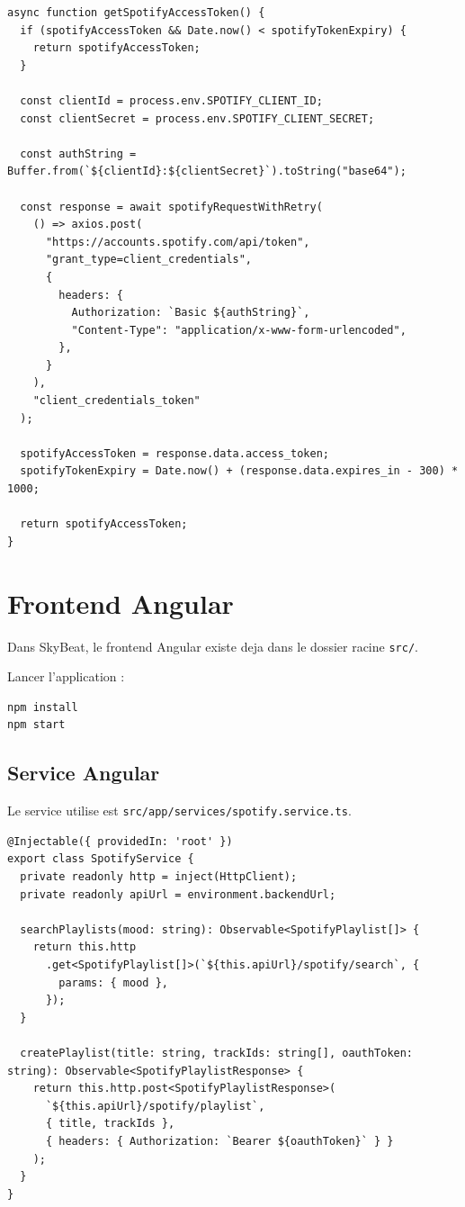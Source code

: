 \documentclass[a4paper,11pt]{article}
\begin{document}
\begin{lstlisting}
async function getSpotifyAccessToken() {
  if (spotifyAccessToken && Date.now() < spotifyTokenExpiry) {
    return spotifyAccessToken;
  }

  const clientId = process.env.SPOTIFY_CLIENT_ID;
  const clientSecret = process.env.SPOTIFY_CLIENT_SECRET;

  const authString = Buffer.from(`${clientId}:${clientSecret}`).toString("base64");

  const response = await spotifyRequestWithRetry(
    () => axios.post(
      "https://accounts.spotify.com/api/token",
      "grant_type=client_credentials",
      {
        headers: {
          Authorization: `Basic ${authString}`,
          "Content-Type": "application/x-www-form-urlencoded",
        },
      }
    ),
    "client_credentials_token"
  );

  spotifyAccessToken = response.data.access_token;
  spotifyTokenExpiry = Date.now() + (response.data.expires_in - 300) * 1000;

  return spotifyAccessToken;
}
\end{lstlisting}

\section{Frontend Angular}

Dans SkyBeat, le frontend Angular existe deja dans le dossier racine \texttt{src/}.

Lancer l'application :

\begin{lstlisting}
npm install
npm start
\end{lstlisting}

\subsection{Service Angular}

Le service utilise est \texttt{src/app/services/spotify.service.ts}.

\begin{lstlisting}
@Injectable({ providedIn: 'root' })
export class SpotifyService {
  private readonly http = inject(HttpClient);
  private readonly apiUrl = environment.backendUrl;

  searchPlaylists(mood: string): Observable<SpotifyPlaylist[]> {
    return this.http
      .get<SpotifyPlaylist[]>(`${this.apiUrl}/spotify/search`, {
        params: { mood },
      });
  }

  createPlaylist(title: string, trackIds: string[], oauthToken: string): Observable<SpotifyPlaylistResponse> {
    return this.http.post<SpotifyPlaylistResponse>(
      `${this.apiUrl}/spotify/playlist`,
      { title, trackIds },
      { headers: { Authorization: `Bearer ${oauthToken}` } }
    );
  }
}
\end{lstlisting}
\end{document}
